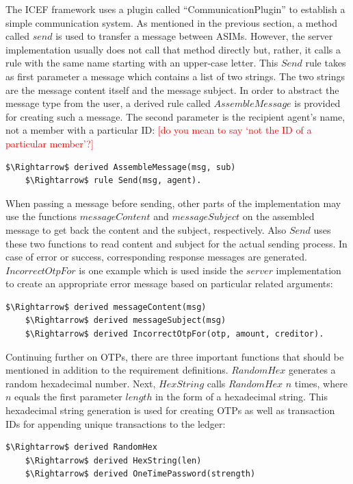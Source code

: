 The ICEF framework uses a plugin called ``CommunicationPlugin'' to establish a simple communication system. As mentioned in the previous section, a method called $send$ is used to transfer a message between ASIMs. However, the server implementation usually does not call that method directly but, rather, it calls a rule with the same name starting with an upper-case letter. This $Send$ rule takes as first parameter a message which contains a list of two strings. The two strings are the message content itself and the message subject. In order to abstract the message type from the user, a derived rule called $AssembleMessage$ is provided for creating such a message. The second parameter is the recipient agent's name, not a member with a particular ID: \textcolor{red}{[do you mean to say `not the ID of a particular member'?]}
\begin{lstlisting}[language=bsl,mathescape=true]
	$\Rightarrow$ derived AssembleMessage(msg, sub)	
	$\Rightarrow$ rule Send(msg, agent).
\end{lstlisting}

When passing a message before sending, other parts of the implementation may use the functions $messageContent$ and $messageSubject$ on the assembled message to get back the content and the subject, respectively. Also $Send$ uses these two functions to read content and subject for the actual sending process. In case of error or success, corresponding response messages are generated. $IncorrectOtpFor$ is one example which is used inside the $server$ implementation to create an appropriate error message based on particular related arguments:
\begin{lstlisting}[language=bsl,mathescape=true]
	$\Rightarrow$ derived messageContent(msg)
	$\Rightarrow$ derived messageSubject(msg)
	$\Rightarrow$ derived IncorrectOtpFor(otp, amount, creditor).
\end{lstlisting}

Continuing further on OTPs, there are three important functions that should be mentioned in addition to the requirement definitions. $RandomHex$ generates a random hexadecimal number. Next, $HexString$ calls $RandomHex$ $n$ times, where $n$ equals the first parameter $length$ in the form of a hexadecimal string. This hexadecimal string generation is used for creating OTPs as well as transaction IDs for appending unique transactions to the ledger:

\begin{lstlisting}[language=bsl,mathescape=true]
	$\Rightarrow$ derived RandomHex
	$\Rightarrow$ derived HexString(len)
	$\Rightarrow$ derived OneTimePassword(strength)
\end{lstlisting}

